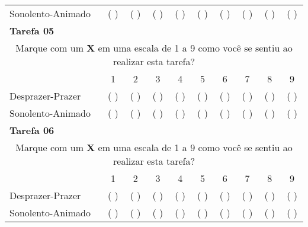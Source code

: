 \begin{table}[ht]
\begin{longtable}{llllllllll}
\multicolumn{1}{p{7.2cm}}{Sonolento-Animado} & \multicolumn{1}{c}{( )} & \multicolumn{1}{c}{( )} & \multicolumn{1}{c}{( )} & \multicolumn{1}{c}{( )} & \multicolumn{1}{c}{( )} & \multicolumn{1}{c}{( )} & \multicolumn{1}{c}{( )} & \multicolumn{1}{c}{( )} & \multicolumn{1}{c}{( )} \\ 
\multicolumn{10}{l}{\textbf{Tarefa 05}} \\ 
\multicolumn{10}{c}{Marque com um \textbf{X} em uma escala de 1 a 9 como você se sentiu ao realizar esta tarefa?} \\ 
\cline{2-10}
\multicolumn{1}{l|}{} & \multicolumn{1}{c|}{1} & \multicolumn{1}{c|}{2} & \multicolumn{1}{c|}{3} & \multicolumn{1}{c|}{4} & \multicolumn{1}{c|}{5} & \multicolumn{1}{c|}{6} & \multicolumn{1}{c|}{7} & \multicolumn{1}{c|}{8} & \multicolumn{1}{c|}{9} \\ 
\cline{2-10}
\multicolumn{1}{p{7.2cm}}{Desprazer-Prazer} & \multicolumn{1}{c}{( )} & \multicolumn{1}{c}{( )} & \multicolumn{1}{c}{( )} & \multicolumn{1}{c}{( )} & \multicolumn{1}{c}{( )} & \multicolumn{1}{c}{( )} & \multicolumn{1}{c}{( )} & \multicolumn{1}{c}{( )} & \multicolumn{1}{c}{( )} \\ 
\multicolumn{1}{p{7.2cm}}{Sonolento-Animado} & \multicolumn{1}{c}{( )} & \multicolumn{1}{c}{( )} & \multicolumn{1}{c}{( )} & \multicolumn{1}{c}{( )} & \multicolumn{1}{c}{( )} & \multicolumn{1}{c}{( )} & \multicolumn{1}{c}{( )} & \multicolumn{1}{c}{( )} & \multicolumn{1}{c}{( )} \\
\multicolumn{10}{l}{\textbf{Tarefa 06}} \\ 
\multicolumn{10}{c}{Marque com um \textbf{X} em uma escala de 1 a 9 como você se sentiu ao realizar esta tarefa?} \\ 
\cline{2-10}
\multicolumn{1}{l|}{} & \multicolumn{1}{c|}{1} & \multicolumn{1}{c|}{2} & \multicolumn{1}{c|}{3} & \multicolumn{1}{c|}{4} & \multicolumn{1}{c|}{5} & \multicolumn{1}{c|}{6} & \multicolumn{1}{c|}{7} & \multicolumn{1}{c|}{8} & \multicolumn{1}{c|}{9} \\ 
\cline{2-10}
\multicolumn{1}{p{7.2cm}}{Desprazer-Prazer} & \multicolumn{1}{c}{( )} & \multicolumn{1}{c}{( )} & \multicolumn{1}{c}{( )} & \multicolumn{1}{c}{( )} & \multicolumn{1}{c}{( )} & \multicolumn{1}{c}{( )} & \multicolumn{1}{c}{( )} & \multicolumn{1}{c}{( )} & \multicolumn{1}{c}{( )} \\ 
\multicolumn{1}{p{7.2cm}}{Sonolento-Animado} & \multicolumn{1}{c}{( )} & \multicolumn{1}{c}{( )} & \multicolumn{1}{c}{( )} & \multicolumn{1}{c}{( )} & \multicolumn{1}{c}{( )} & \multicolumn{1}{c}{( )} & \multicolumn{1}{c}{( )} & \multicolumn{1}{c}{( )} & \multicolumn{1}{c}{( )} \\ 
\end{longtable}
\end{table}